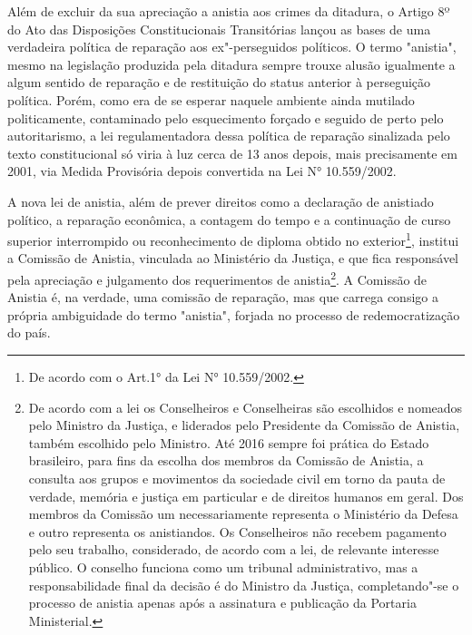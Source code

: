 Além de excluir da sua apreciação a anistia aos crimes da ditadura, o
Artigo 8º do Ato das Disposições Constitucionais Transitórias lançou as
bases de uma verdadeira política de reparação aos ex"-perseguidos
políticos. O termo "anistia", mesmo na legislação produzida pela
ditadura sempre trouxe alusão igualmente a algum sentido de reparação e
de restituição do status anterior à perseguição política. Porém, como
era de se esperar naquele ambiente ainda mutilado politicamente,
contaminado pelo esquecimento forçado e seguido de perto pelo
autoritarismo, a lei regulamentadora dessa política de reparação
sinalizada pelo texto constitucional só viria à luz cerca de 13 anos
depois, mais precisamente em 2001, via Medida Provisória depois
convertida na Lei N° 10.559/2002.

A nova lei de anistia, além de prever direitos como a declaração de
anistiado político, a reparação econômica, a contagem do tempo e a
continuação de curso superior interrompido ou reconhecimento de diploma
obtido no exterior\footnote{De acordo com o Art.1° da Lei N°
  10.559/2002.}, institui a Comissão de Anistia, vinculada ao Ministério
da Justiça, e que fica responsável pela apreciação e julgamento dos
requerimentos de anistia\footnote{De acordo com a lei os Conselheiros e
  Conselheiras são escolhidos e nomeados pelo Ministro da Justiça, e
  liderados pelo Presidente da Comissão de Anistia, também escolhido
  pelo Ministro. Até 2016 sempre foi prática do Estado brasileiro, para
  fins da escolha dos membros da Comissão de Anistia, a consulta aos
  grupos e movimentos da sociedade civil em torno da pauta de verdade,
  memória e justiça em particular e de direitos humanos em geral. Dos
  membros da Comissão um necessariamente representa o Ministério da
  Defesa e outro representa os anistiandos. Os Conselheiros não recebem
  pagamento pelo seu trabalho, considerado, de acordo com a lei, de
  relevante interesse público. O conselho funciona como um tribunal
  administrativo, mas a responsabilidade final da decisão é do Ministro
  da Justiça, completando"-se o processo de anistia apenas após a
  assinatura e publicação da Portaria Ministerial.}. A Comissão de
Anistia é, na verdade, uma comissão de reparação, mas que carrega
consigo a própria ambiguidade do termo "anistia", forjada no processo de
redemocratização do país.

